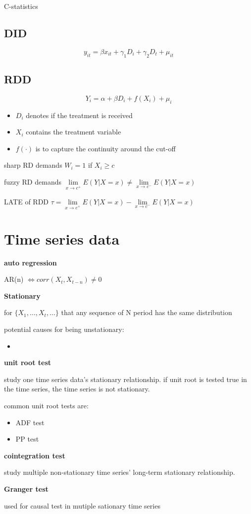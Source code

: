 \documentclass{article}
\providecommand{\tightlist}{
  \setlength{\itemsep}{0pt}
  \setlength{\parskip}{0pt}}
\begin{document}
C-statistics

\subsection{DID}

\begin{equation}
  y_{it}=\beta x_{it} + \gamma_1 D_i +\gamma_2 D_t + \mu_{it}
\end{equation}


\subsection{RDD}
\begin{equation}
  Y_i = \alpha + \beta D_i + f(X_i) + \mu_i 
\end{equation}

\begin{itemize}
\tightlist
  \item $D_i$ denotes if the treatment is received
  \item $X_i$ contains the treatment variable
  \item $f(\cdot)$ is to capture the continuity around the cut-off
\end{itemize}

sharp RD demands $W_i=1$ if $X_i\geqslant c$

fuzzy RD demands $\lim\limits_{x \rightarrow c^+} E(Y|X=x)\neq\lim\limits_{x \rightarrow c^-} E(Y|X=x)$

LATE of RDD $\tau=\lim\limits_{x \rightarrow c^+} E(Y|X=x)-\lim\limits_{x \rightarrow c^-} E(Y|X=x)$


\section{Time series data}

\textbf{auto regression}

AR(n) $\iff corr(X_t,X_{t-n})\neq 0$

\textbf{Stationary}

for $\{X_1,\dots,X_t,\dots\}$ that any sequence of N period has the same distribution

potential causes for being unstationary:
\begin{itemize}
\tightlist
  \item 
\end{itemize}


\textbf{unit root test}

study one time series data's stationary relationship. if unit root is tested true in the time series, the time series is not stationary.

common unit root tests are:
\begin{itemize}
\tightlist
  \item ADF test
  \item PP test
\end{itemize}

\textbf{cointegration test}

study multiple non-stationary time series' long-term stationary relationship.

\textbf{Granger test}

used for causal test in mutiple sationary time series
\end{document}
